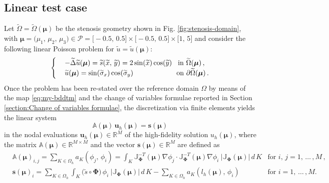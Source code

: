 \documentclass[12pt, a4paper, twoside, openright, notitlepage]{report}
\numberwithin{equation}{chapter}
\theoremstyle{theorem}
\theoremstyle{definition}
\theoremstyle{remark}
\theoremstyle{proposition}
\numberwithin{figure}{chapter}
\newcommand{\wt}[1]{\widetilde{#1}}
\newcommand{\bg}[1]{\boldsymbol{#1}}
\begin{document}
	\subsection{Linear test case}
	\label{section:poisson2d-1}
	
		Let $\wt{\Omega} = \wt{\Omega}(\bg{\mu})$ be the stenosis geometry shown in Fig. \ref{fig:stenosis-domain}, with $\bg{\mu} = \big( \mu_1, \, \mu_2, \, \mu_3 \big) \in \mathcal{P} = \big[-0.5, \, 0.5\big] \times \big[-0.5, \, 0.5\big] \times \big[1 , \, 5\big]$ and consider the following linear Poisson problem for $\wt{u} = \wt{u}(\bg{\mu})$:
		\begin{equation}
			\label{eq:poisson2d-1}
			\begin{cases}
				& - \wt{\Delta} \wt{u}(\bg{\mu}) = \wt{s} (\wt{x}, \, \wt{y}) = 2 \sin(\wt{x}) \cos(\wt{y}) \hspace*{0.3cm} \text{in $\wt{\Omega}(\bg{\mu})$} \, , \\
				& \wt{u}(\bg{\mu}) = \sin(\wt{\sigma}_x) \cos(\wt{\sigma}_y) \hspace*{2.175cm} \text{on $\partial \wt{\Omega}(\bg{\mu})$} \, .
			\end{cases}
		\end{equation}
		Once the problem has been re-stated over the reference domain $\Omega$ by means of the map \eqref{eq:my-bddtm} and the change of variables formulae reported in Section \ref{section:Change of variables formulae}, the discretization via finite elements yields the linear system
		\begin{equation}
			\label{eq:poisson2d-1-fe-system}
			\mathbb{A}(\bg{\mu}) \, \mathbf{u}_h(\bg{\mu}) = \mathbf{s}(\bg{\mu})
		\end{equation}
		in the nodal evaluations $\mathbf{u}_h(\bg{\mu}) \in \mathbb{R}^M$ of the high-fidelity solution $u_h(\bg{\mu})$, where the matrix $\mathbb{A}(\bg{\mu}) \in \mathbb{R}^{M \times M}$ and the vector $\mathbf{s}(\bg{\mu}) \in \mathbb{R}^M$ are defined as
		\begin{equation*}
			\begin{aligned}
				& \mathbb{A}(\bg{\mu})_{i,j} = \sum_{K \in \Omega_h} a_K(\phi_j, \, \phi_i) = \int_K \mathbb{J}_{\bg{\Phi}}^{-T}(\bg{\mu}) \nabla \phi_j \cdot \mathbb{J}_{\bg{\Phi}}^{-T}(\bg{\mu}) \nabla \phi_i ~ \big| \mathbb{J}_{\bg{\Phi}}(\bg{\mu}) \big| \, d\,K & \text{for $i$, $j = 1, \, \ldots \, , M$} \, , \\
				& \mathbf{s}(\bg{\mu})_i = \sum_{K \in \Omega_h} \int_K \big( \wt{s} \circ \bg{\Phi} \big) \, \phi_i ~ \big| \mathbb{J}_{\bg{\Phi}}(\bg{\mu}) \big| \, d\,K - \sum_{K \in \Omega_h} a_K(l_h(\bg{\mu}), \, \phi_i) & \text{for $i = 1, \, \ldots \, , M$}.
			\end{aligned}
		\end{equation*}
\end{document}
